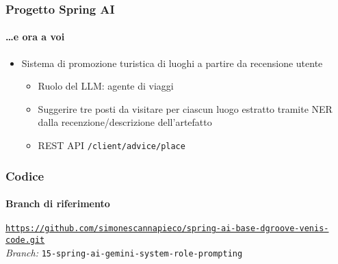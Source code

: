 %
\begin{frame}[t,fragile] \frametitle{Progetto Spring AI}
    \framesubtitle{\ldots e ora a voi}
    {\small
        \begin{itemize}[leftmargin=10pt,align=right]
            \item[\alert{\faArrowCircleRight}] Sistema di promozione turistica di \alert{luoghi} a partire da recensione utente
            \begin{itemize}[leftmargin=10pt,align=right]
                \item[\alert{\faArrowCircleRight}] Ruolo del LLM: \alert{agente di viaggi}
                \item[\alert{\faArrowCircleRight}] Suggerire tre posti da visitare per ciascun luogo estratto tramite NER dalla recenzione/descrizione dell'artefatto  
                \item[\alert{\faArrowCircleRight}] REST API \texttt{/client/advice/place}  
            \end{itemize}
        \end{itemize}
    }
\end{frame}
%
\begin{frame}[fragile] \frametitle{Codice}
    \framesubtitle{Branch di riferimento}
	\begin{center}
		{\scriptsize \href{https://github.com/simonescannapieco/spring-ai-base-dgroove-venis-code.git}{\texttt{https://github.com/simonescannapieco/spring-ai-base-dgroove-venis-code.git}}}\\
		\textit{Branch:} \alert{\texttt{15-spring-ai-gemini-system-role-prompting}}
	\end{center}
\end{frame}